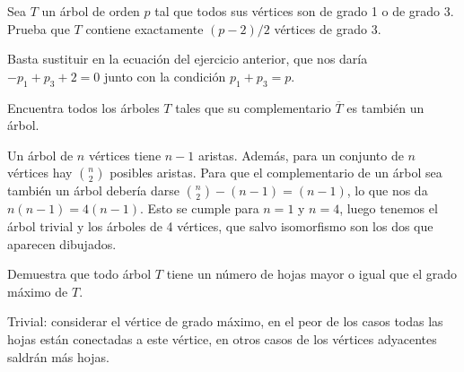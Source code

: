 \documentclass[twoside]{article}
\begin{document}
\newpage

\begin{ejercicio}{1.3}

Sea $T$ un árbol de orden $p$ tal que todos sus vértices son de grado 1 o de grado 3. Prueba
que $T$ contiene exactamente $(p - 2)/2$ vértices de grado 3.
\end{ejercicio}
\begin{solucion}
Basta sustituir en la ecuación del ejercicio anterior, que nos daría $-p_1+p_3+2=0$ junto con la condición $p_1+p_3=p$. 
\end{solucion}

\newpage

\begin{ejercicio}{1.4}

Encuentra todos los árboles $T$ tales que su complementario $\overline{T}$ es también un árbol.
\end{ejercicio}
\begin{solucion}
Un árbol de $n$ vértices tiene $n-1$ aristas. Además, para un conjunto de $n$ vértices hay $\binom{n}{2}$ posibles aristas. Para que el complementario de un árbol sea también un árbol debería darse $\binom{n}{2}-(n-1)=(n-1)$, lo que nos da $n(n-1)=4(n-1)$. Esto se cumple para $n=1$ y $n=4$, luego tenemos el árbol trivial y los árboles de 4 vértices, que salvo isomorfismo son los dos que aparecen dibujados.


\end{solucion}

\newpage

\begin{ejercicio}{1.5}

Demuestra que todo árbol $T$ tiene un número de hojas mayor o igual que el grado máximo
de $T$.
\end{ejercicio}
\begin{solucion}
Trivial: considerar el vértice de grado máximo, en el peor de los casos todas las hojas están conectadas a este vértice, en otros casos de los vértices adyacentes saldrán más hojas. 
\end{solucion}
\end{document}
